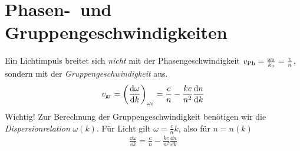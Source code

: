 \section{Phasen-~und Gruppengeschwindigkeiten}
Ein Lichtimpuls breitet sich \emph{nicht} mit der
Phasengeschwindigkeit $v_\text{Ph}=\frac{\omegao}{k_0}=\frac{c}{n}$,
sondern mit der \emph{Gruppengeschwindigkeit}%
%
aus. 
\begin{gather}
  v_\text{gr} = \left(\ddif[\omega]{k}\right)_{\omega_0}
  =\frac{c}{n}-\frac{kc}{n^2}\ddif[n]{k}
\end{gather}
Wichtig! Zur Berechnung der Gruppengeschwindigkeit benötigen wir die
\emph{Dispersionrelation} $\omega(k)$. Für Licht gilt
$\omega=\frac{c}{n}k$, also für $n=n(k)$
\begin{gather*}
  \frac{\dd \omega}{\dd k}=\frac{c}{n}-\frac{kc}{n^2}\frac{\dd n}{\dd k}
\end{gather*}






